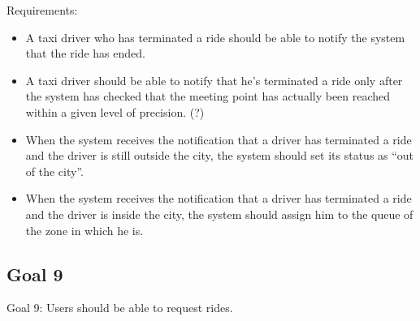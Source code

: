 Requirements:
\begin{itemize}
\item A taxi driver who has terminated a ride should be able to notify the system that the ride has ended.
\item A taxi driver should be able to notify that he’s terminated a ride only after the system has checked that the meeting point has actually been reached within a given level of precision. (?) 
\item When the system receives the notification that a driver has terminated a ride and the driver is still outside the city, the system should set its status as “out of the city”.
\item When the system receives the notification that a driver has terminated a ride and the driver is inside the city, the system should assign him to the queue of the zone in which he is.
\end{itemize}

\subsection{Goal 9}
Goal 9: Users should be able to request rides.

